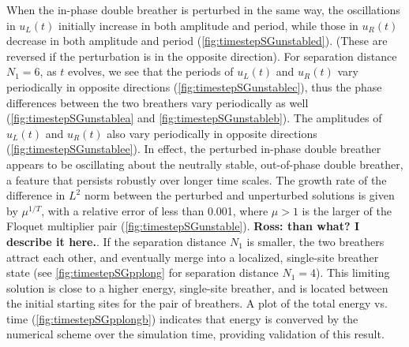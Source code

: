 \documentclass[12pt,reqno]{amsart}
\theoremstyle{definition}
\begin{document}
When the in-phase double breather is perturbed in the same way, the oscillations in $u_L(t)$ initially increase in both amplitude and period, while those in $u_R(t)$ decrease in both amplitude and period (\cref{fig:timestepSGunstabled}). (These are reversed if the perturbation is in the opposite direction). For separation distance $N_1 = 6$, as $t$ evolves, we see that the periods of $u_L(t)$ and $u_R(t)$ vary periodically in opposite directions (\cref{fig:timestepSGunstablec}), thus the phase differences between the two breathers vary periodically as well (\cref{fig:timestepSGunstablea} and \cref{fig:timestepSGunstableb}). The amplitudes of $u_L(t)$ and $u_R(t)$ also vary periodically in opposite directions (\cref{fig:timestepSGunstablee}). In effect, the perturbed in-phase double breather appears to be oscillating about the neutrally stable, out-of-phase double breather, a feature
that persists robustly over longer time scales. The growth rate of the difference in $L^2$ norm between the perturbed and unperturbed solutions is given by $\mu^{1/T}$, with a relative error of less than 0.001, where $\mu > 1$ is the larger of the Floquet multiplier pair (\cref{fig:timestepSGunstable}). {\bf Ross: than what? I describe it here.}. If the separation distance $N_1$ is smaller, the two breathers attract each other, and eventually merge into a localized, single-site breather state (see \cref{fig:timestepSGpplong} for separation distance $N_1 = 4$). This limiting solution is close to a higher energy, single-site breather, and is located between the initial starting sites for the pair of breathers. A plot of the total energy vs. time (\cref{fig:timestepSGpplongb}) indicates that energy is converved by the numerical scheme over the simulation time, providing validation of this result.
\end{document}
